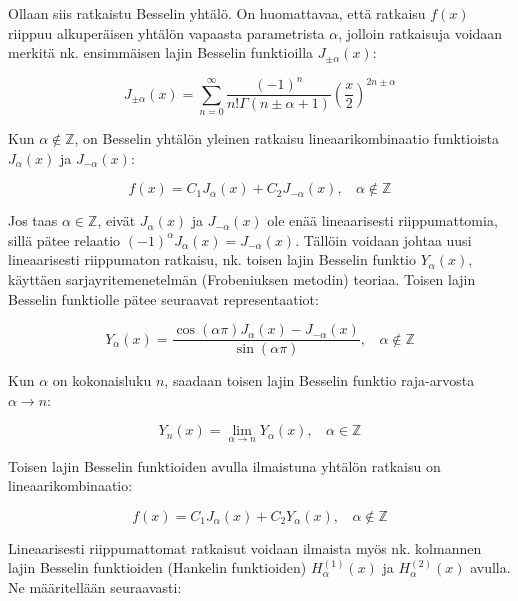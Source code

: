 \documentclass[../johdoksia.tex]{subfiles}
\begin{document}
	Ollaan siis ratkaistu Besselin yhtälö. On huomattavaa, että ratkaisu $f(x)$ riippuu alkuperäisen yhtälön vapaasta parametrista $\alpha$, jolloin ratkaisuja voidaan merkitä nk. ensimmäisen lajin Besselin funktioilla $J_{\pm\alpha}(x)$:
	
	\begin{equation}
		\boxed{J_{\pm\alpha}(x) = \sum_{n = 0}^{\infty}\frac{(-1)^n}{n!\Gamma(n\pm\alpha + 1)}\left(\frac{x}{2}\right)^{2n\pm\alpha}}
	\end{equation}
	
	Kun $\alpha \notin \mathbb{Z}$, on Besselin yhtälön yleinen ratkaisu lineaarikombinaatio funktioista $J_{\alpha}(x)$ ja $J_{-\alpha}(x)$:
	
	\begin{equation}
		\boxed{f(x) = C_1J_{\alpha}(x) + C_2J_{-\alpha}(x), \ \ \ \ \alpha \notin \mathbb{Z}}
	\end{equation}
	
	Jos taas $\alpha \in \mathbb{Z}$, eivät $J_{\alpha}(x)$ ja $J_{-\alpha}(x)$ ole enää lineaarisesti riippumattomia, sillä pätee relaatio $(-1)^\alpha J_{\alpha}(x) = J_{-\alpha}(x)$. Tällöin voidaan johtaa uusi lineaarisesti riippumaton ratkaisu, nk. toisen lajin Besselin funktio $Y_{\alpha}(x)$, käyttäen sarjayritemenetelmän (Frobeniuksen metodin) teoriaa. Toisen lajin Besselin funktiolle pätee seuraavat representaatiot:
	
	\begin{equation}
		\boxed{Y_{\alpha}(x) = \frac{\cos(\alpha \pi)J_{\alpha}(x) - J_{-\alpha}(x)}{\sin(\alpha\pi)}, \ \ \ \ \alpha\notin\mathbb{Z}}
	\end{equation}
	
	Kun $\alpha$ on kokonaisluku $n$, saadaan toisen lajin Besselin funktio raja-arvosta $\alpha \to n$:
	
	\begin{equation}
		\boxed{Y_{n}(x) = \lim\limits_{\alpha\to n}Y_{\alpha}(x), \ \ \ \ \alpha\in\mathbb{Z}}
	\end{equation}
	
	Toisen lajin Besselin funktioiden avulla ilmaistuna yhtälön ratkaisu on lineaarikombinaatio:
	
	\begin{equation}
		\boxed{f(x) = C_1J_{\alpha}(x) + C_2Y_{\alpha}(x), \ \ \ \ \alpha \notin \mathbb{Z}}
	\end{equation}
	
	Lineaarisesti riippumattomat ratkaisut voidaan ilmaista myös nk. kolmannen lajin Besselin funktioiden (Hankelin funktioiden) $H^{(1)}_{\alpha}(x)$ ja $H^{(2)}_{\alpha}(x)$ avulla. Ne määritellään seuraavasti:
	
\end{document}
